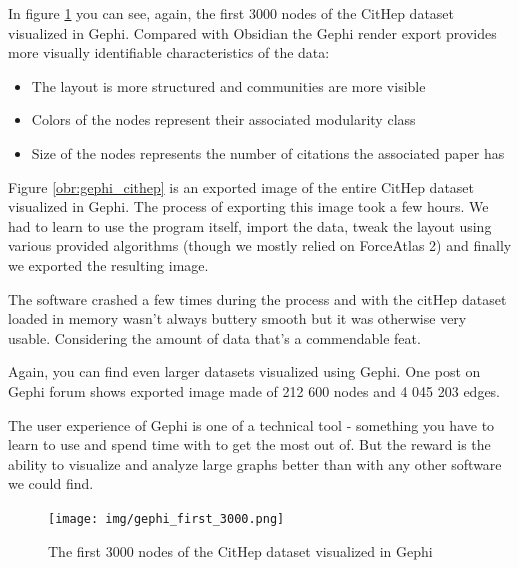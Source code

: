 In figure \ref{obr:gephi_cithep_3k} you can see, again, the first 3000 nodes of the CitHep dataset visualized in Gephi.
Compared with Obsidian the Gephi render export provides more visually identifiable characteristics of the data:

\begin{itemize}
  \item The layout is more structured and communities are more visible
  \item Colors of the nodes represent their associated modularity class
  \item Size of the nodes represents the number of citations the associated paper has
\end{itemize}

Figure \ref{obr:gephi_cithep} is an exported image of the entire CitHep dataset visualized in Gephi.
The process of exporting this image took a few hours.
We had to learn to use the program itself, import the data,
tweak the layout using various provided algorithms (though we mostly relied on ForceAtlas 2) and finally we exported the resulting image.

The software crashed a few times during the process and with the citHep dataset loaded in memory wasn't always buttery smooth but it was otherwise very usable.
Considering the amount of data that's a commendable feat.

Again, you can find even larger datasets visualized using Gephi.
One post on Gephi forum \cite{gephi_big_graph_forum} shows exported image made of 212 600 nodes and 4 045 203 edges.

The user experience of Gephi is one of a technical tool - something you have to learn to use and spend time with to get the most out of.
But the reward is the ability to visualize and analyze large graphs better than with any other software we could find.

\begin{figure}[p]\centering
  \texttt{[image: img/gephi\_first\_3000.png]}
  \caption{The first 3000 nodes of the CitHep dataset visualized in Gephi}
  \label{obr:gephi_cithep_3k}
\end{figure}


